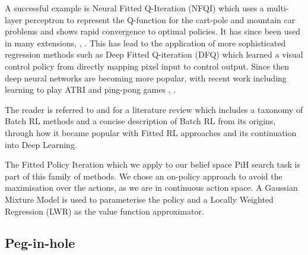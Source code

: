 \documentclass[final,5p,times,twocolumn]{elsarticle}
\begin{document}



A successful example is Neural Fitted Q-Iteration (NFQI) \cite{Riedmiller2005} which 
uses a multi-layer perceptron to represent the Q-function for the cart-pole and mountain car problems and 
shows rapid convergence to optimal policies. It has since been used in many extensions, \cite{NAC_2008}, \cite{rl_gmm_2010}.
This has lead to the application of more sophisticated regression methods such as 
Deep Fitted Q-iteration (DFQ) \cite{Lange_riedmiller_2010} which learned a visual control policy from directly mapping pixel 
input to control output. Since then deep neural networks are becoming more popular, with recent work including learning 
to play ATRI and ping-pong games \cite{mnih-dqn-2015}, \cite{DRQ_AAAI_2015}. 

The reader is referred to \cite{approx_rl_overview_2011} and \cite[Chap 2]{RL_state_art_2012} for a literature 
review which includes a taxonomy of Batch RL methods and a concise description of Batch RL from its origins, 
through how it became popular with Fitted RL approaches and its continuation into Deep Learning.

The Fitted Policy Iteration which we apply to our belief space PiH search task is part of this family of methods.
We chose an on-policy approach to avoid the maximisation over the actions, as we are in continuous action space.
A Gaussian Mixture Model is used to parameterise the policy and a Locally Weighted Regression (LWR) as 
the value function approximator.




\subsection{Peg-in-hole}

\end{document}
